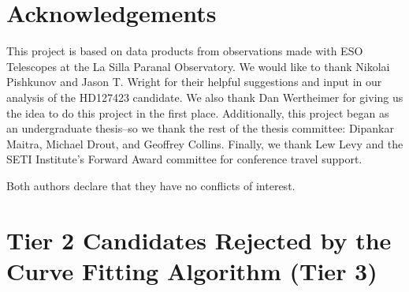 \documentclass[twocolumn]{aastex701}
\begin{document}
\section{Acknowledgements}
This project is based on data products from observations made with ESO Telescopes at the La Silla Paranal Observatory. We would like to thank Nikolai Pishkunov and Jason T. Wright for their helpful suggestions and input in our analysis of the HD127423 candidate. We also thank Dan Wertheimer for giving us the idea to do this project in the first place. Additionally, this project began as an undergraduate thesis--so we thank the rest of the thesis committee: Dipankar Maitra, Michael Drout, and Geoffrey Collins. Finally, we thank Lew Levy and the SETI Institute's Forward Award committee for conference travel support.


Both authors declare that they have no conflicts of interest.

\appendix

\section{Tier 2 Candidates Rejected by the Curve Fitting Algorithm (Tier 3)}
\label{s:rejects}
\end{document}
